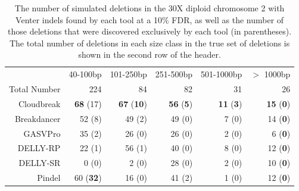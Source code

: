 \documentclass[11pt]{article}
\begin{document}
\begin{table}[h]
\begin{center}
\begin{tabular}{rrrrrr}
  \hline
 & 40-100bp  & 101-250bp  & 251-500bp & 501-1000bp & $>$ 1000bp \\ 
 Total Number & 224 &  84 & 82 &  31 & 26\\ 
  \hline
  Cloudbreak  & \textbf{68} (17)  & \textbf{67} (\textbf{10}) &  \textbf{56} (\textbf{5}) & \textbf{11} (\textbf{3}) & \textbf{15} (\textbf{0}) \\ 
  Breakdancer & 52 (8)  & 49 (2) &  49 (0) & 7 (0) & 14 (\textbf{0}) \\ 
  GASVPro     & 35 (2)  & 26 (0) &  26 (0) & 2 (0) & 6 (\textbf{0}) \\ 
  DELLY-RP       & 22 (1)  & 56 (1) &  40 (0) & 8 (0) & 12 (\textbf{0}) \\ 
  DELLY-SR       & 0 (0)  & 2 (0) &  28 (0) & 2 (0) & 10 (\textbf{0}) \\ 
  Pindel      & 60 (\textbf{32})  & 16 (0) &  41 (2) & 1 (0) & 12 (\textbf{0})\\ 
   \hline
\end{tabular}
\end{center}
\caption{The number of simulated deletions in the 30X diploid chromosome 2 with Venter indels found by each tool at a 10\% FDR, as well as the number of those deletions that were discovered exclusively by each tool (in parentheses). The total number of deletions in each size class in the true set of deletions is shown in the second row of the header.}
\label{chr2DeletionPredsFDR10}
\end{table}

\newpage 
\end{document}
